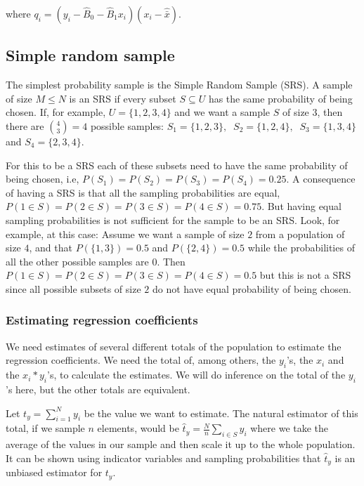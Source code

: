 \documentclass{article}
\begin{document}
where \(q_i = (y_i - \hat{B}_0 - \hat{B}_1 x_i)(x_i - \hat{\bar{x}})\).

\subsection{Simple random sample} \label{sec:SRS}

The simplest probability sample is the Simple Random Sample (SRS). A
sample of size \(M \leq N\) is an SRS if every subset \(S \subseteq U\) has the same
probability of being chosen.
If, for example, \(U = \{1, 2, 3, 4\}\) and we want a sample \(S\) of
size \(3\), then there are \(\binom{4}{3} = 4\)  possible samples:
\( S_1 = \{1, 2, 3\},\ \)
\( S_2 = \{1, 2, 4\},\ \)
\( S_3 = \{1, 3, 4\}\ \) and
\( S_4 = \{2, 3, 4\} \).

For this to be a SRS each of these subsets need to have the same probability of
being chosen, i.e, \(P(S_1) = P(S_2) = P(S_3) = P(S_4) = 0.25\). A consequence of
having a SRS is that all the sampling probabilities are equal, \(P(1 \in S) =
P(2 \in S) = P(3 \in S) = P(4 \in S) = 0.75\). But having equal sampling
probabilities is not sufficient for the sample to be an SRS.
Look, for example, at this case:
Assume we want a sample of size \(2\) from a population of size \(4\), and that
\(P(\{1, 3\}) = 0.5\) and \(P(\{2, 4\}) = 0.5\) while the probabilities of all the
other possible samples are \(0\). Then \(P(1 \in S) = P(2 \in S) = P(3 \in S) = P(4 \in S) = 0.5\)
but this is not a SRS since all possible subsets of size \(2\) do not have equal
probability of being chosen.


\subsubsection{Estimating regression coefficients}

We need estimates of several different totals of the population to estimate the
regression coefficients. We need the total of, among others, the \(y_i\)'s, the
\(x_i\) and the \(x_i * y_i\)'s, to calculate the estimates.
We will do inference on the total of the \(y_i\)'s here, but the other totals
are equivalent.

Let
\(
 t_y = \sum_{i = 1}^{N} y_i
\)
be the value we want to estimate.
The natural estimator of this total, if we sample \(n\) elements, would be
\(
\hat{t}_y = \frac{N}{n}\sum_{i \in S} y_i
\)
where we take the average of the values in our sample and then scale it up to
the whole population.
It can be shown using indicator variables and sampling probabilities that
\(\hat{t}_y\) is an unbiased estimator for \(t_y\).
\end{document}
